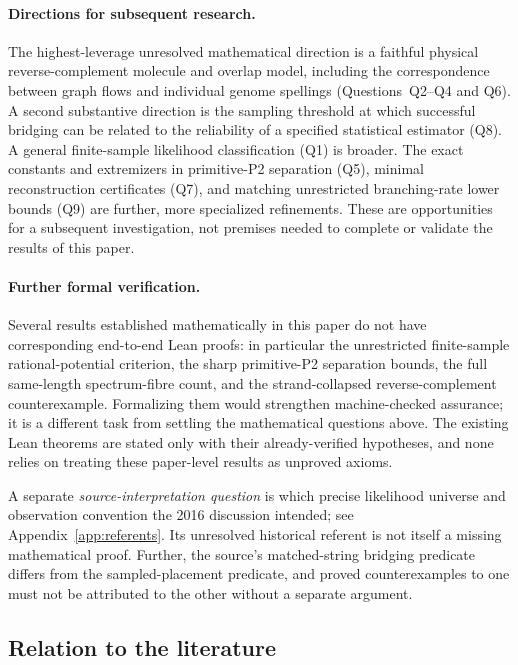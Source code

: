 \paragraph{Directions for subsequent research.}
The highest-leverage unresolved mathematical direction is a faithful physical
reverse-complement molecule and overlap model, including the correspondence
between graph flows and individual genome spellings
(Questions~Q2--Q4 and Q6).  A second substantive direction is the
sampling threshold at which successful bridging can be related to the
reliability of a specified statistical estimator (Q8).
A general finite-sample likelihood classification (Q1) is broader.
The exact constants and extremizers in primitive-P2 separation (Q5),
minimal reconstruction certificates (Q7), and matching unrestricted
branching-rate lower bounds (Q9) are further, more specialized refinements.
These are opportunities for a subsequent investigation, not premises needed
to complete or validate the results of this paper.

\paragraph{Further formal verification.}
Several results established mathematically in this paper do not have
corresponding end-to-end Lean proofs: in particular the unrestricted
finite-sample rational-potential criterion, the sharp
primitive-P2 separation bounds, the full same-length spectrum-fibre
count, and the strand-collapsed reverse-complement counterexample.
Formalizing them would strengthen machine-checked assurance; it is
a different task from settling the mathematical questions above.
The existing Lean theorems are stated only with their already-verified
hypotheses, and none relies on treating these paper-level results as
unproved axioms.

A separate \emph{source-interpretation question} is which precise
likelihood universe and observation convention the 2016 discussion
intended; see Appendix~\ref{app:referents}.  Its unresolved historical
referent is not itself a missing mathematical proof.  Further,
the source's matched-string bridging predicate differs from the
sampled-placement predicate, and proved counterexamples to one
must not be attributed to the other without a separate argument.

\subsection{Relation to the literature}

